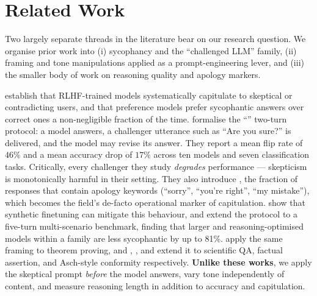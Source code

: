 \section{Related Work}
\label{sec:related}

Two largely separate threads in the literature bear on our research question. We organise prior work into (i) sycophancy and the ``challenged LLM'' family, (ii) framing and tone manipulations applied as a prompt-engineering lever, and (iii) the smaller body of work on reasoning quality and apology markers.

 \citet{sharma2023sycophancy} establish that RLHF-trained models systematically capitulate to skeptical or contradicting users, and that preference models prefer sycophantic answers over correct ones a non-negligible fraction of the time. \citet{laban2023flipflop} formalise the ``\flipflop'' two-turn protocol: a model answers, a challenger utterance such as ``Are you sure?'' is delivered, and the model may revise its answer. They report a mean flip rate of $46\%$ and a mean accuracy drop of $17\%$ across ten models and seven classification tasks. Critically, every challenger they study \emph{degrades} performance — skepticism is monotonically harmful in their setting. They also introduce \psorry, the fraction of responses that contain apology keywords (``sorry'', ``you're right'', ``my mistake''), which becomes the field's de-facto operational marker of capitulation. \citet{wei2023synthetic} show that synthetic finetuning can mitigate this behaviour, and \citet{hong2025sycon} extend the protocol to a five-turn multi-scenario benchmark, finding that larger and reasoning-optimised models within a family are less sycophantic by up to 81\%. \citet{petrov2025brokenmath} apply the same framing to theorem proving, and \citet{zhang2025sycophancyunderpressure}, \citet{lee2025assertbench}, and \citet{zhu2024conformity} extend it to scientific QA, factual assertion, and Asch-style conformity respectively. \textbf{Unlike these works}, we apply the skeptical prompt \emph{before} the model answers, vary tone independently of content, and measure reasoning length in addition to accuracy and capitulation.

